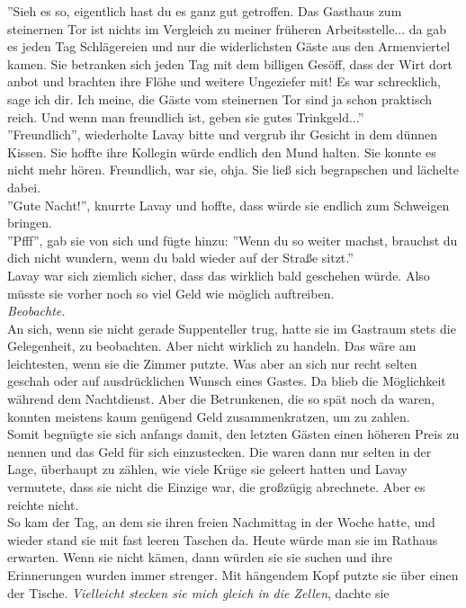''Sieh es so, eigentlich hast du es ganz gut getroffen. Das Gasthaus zum steinernen Tor ist nichts 
im Vergleich zu meiner früheren Arbeitsstelle... da gab es jeden Tag Schlägereien und nur die 
widerlichsten Gäste aus den Armenviertel kamen. Sie betranken sich jeden Tag mit dem billigen 
Gesöff, dass der Wirt dort anbot und brachten ihre Flöhe und weitere Ungeziefer mit! Es war 
schrecklich, sage ich dir. Ich meine, die Gäste vom steinernen Tor sind ja schon praktisch reich. 
Und wenn man freundlich ist, geben sie gutes Trinkgeld...''\\
''Freundlich'', wiederholte Lavay bitte und vergrub ihr Gesicht in dem dünnen Kissen. Sie hoffte 
ihre Kollegin würde endlich den Mund halten. Sie konnte es nicht mehr hören. Freundlich, war sie, 
ohja. Sie ließ sich begrapschen und lächelte dabei.\\
''Gute Nacht!'', knurrte Lavay und hoffte, dass würde sie endlich zum Schweigen bringen.\\
''Pfff'', gab sie von sich und fügte hinzu: ''Wenn du so weiter machst, brauchst du dich nicht 
wundern, wenn du bald wieder auf der Straße sitzt.''\\
Lavay war sich ziemlich sicher, dass das wirklich bald geschehen würde. Also müsste sie vorher noch 
so viel Geld wie möglich auftreiben.\\
\textit{Beobachte.}\\
An sich, wenn sie nicht gerade Suppenteller trug, hatte sie im Gastraum stets die Gelegenheit, zu 
beobachten. Aber nicht wirklich zu handeln. Das wäre am leichtesten, wenn sie die Zimmer putzte. 
Was aber an sich nur recht selten geschah oder auf ausdrücklichen Wunsch eines Gastes. Da blieb die 
Möglichkeit während dem Nachtdienst. Aber die Betrunkenen, die so spät noch da waren, konnten 
meistens kaum genügend Geld zusammenkratzen, um zu zahlen.\\
Somit begnügte sie sich anfangs damit, den letzten Gästen einen höheren Preis zu nennen und das 
Geld für sich einzustecken. Die waren dann nur selten in der Lage, überhaupt zu zählen, wie viele 
Krüge sie geleert hatten und Lavay vermutete, dass sie nicht die Einzige war, die großzügig 
abrechnete. Aber es reichte nicht.\\
So kam der Tag, an dem sie ihren freien Nachmittag in der Woche hatte, und wieder stand sie mit 
fast leeren Taschen da. Heute würde man sie im Rathaus erwarten. Wenn sie nicht kämen, dann würden 
sie sie suchen und ihre Erinnerungen wurden immer strenger. Mit hängendem Kopf putzte sie über 
einen der Tische. \textit{Vielleicht stecken sie mich gleich in die Zellen}, dachte sie 
